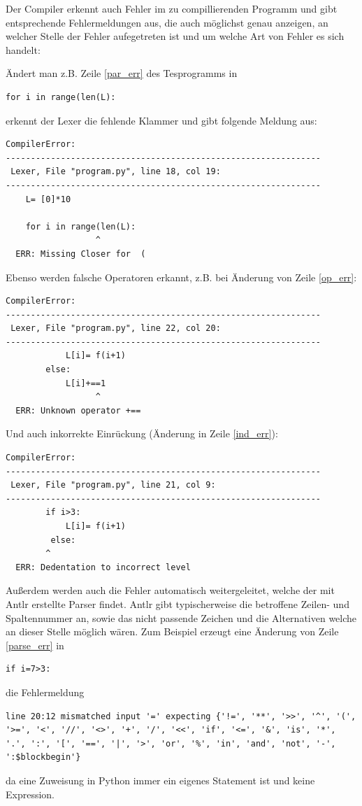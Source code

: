 Der Compiler erkennt auch Fehler im zu compillierenden Programm und gibt entsprechende Fehlermeldungen aus, die auch möglichst genau anzeigen, an welcher Stelle der Fehler aufegetreten ist und um welche Art von Fehler es sich handelt:

Ändert man z.B. Zeile \ref{par_err} des Tesprogramms in
\begin{lstlisting}
for i in range(len(L):
\end{lstlisting}

erkennt der Lexer die fehlende Klammer und gibt folgende Meldung aus:
\begin{lstlisting}
CompilerError: 
---------------------------------------------------------------
 Lexer, File "program.py", line 18, col 19:
---------------------------------------------------------------
    L= [0]*10

    for i in range(len(L):
                  ^
  ERR: Missing Closer for  ( 
\end{lstlisting}

\clearpage

Ebenso werden falsche Operatoren erkannt, z.B. bei Änderung von Zeile \ref{op_err}:
\begin{lstlisting}
CompilerError: 
---------------------------------------------------------------
 Lexer, File "program.py", line 22, col 20:
---------------------------------------------------------------
            L[i]= f(i+1)
        else:
            L[i]+==1
                  ^
  ERR: Unknown operator +==
\end{lstlisting}

Und auch inkorrekte Einrückung (Änderung in Zeile \ref{ind_err}):
\begin{lstlisting}
CompilerError: 
---------------------------------------------------------------
 Lexer, File "program.py", line 21, col 9:
---------------------------------------------------------------
        if i>3:
            L[i]= f(i+1)
         else:
        ^
  ERR: Dedentation to incorrect level  
\end{lstlisting}

Außerdem werden auch die Fehler automatisch weitergeleitet, welche der mit Antlr erstellte Parser findet. Antlr gibt typischerweise die betroffene Zeilen- und Spaltennummer an, sowie das nicht passende Zeichen und die Alternativen welche an dieser Stelle möglich wären. Zum Beispiel erzeugt eine Änderung von Zeile \ref{parse_err} in
\begin{lstlisting}
if i=7>3:
\end{lstlisting}
die Fehlermeldung
\begin{lstlisting}
line 20:12 mismatched input '=' expecting {'!=', '**', '>>', '^', '(', '>=', '<', '//', '<>', '+', '/', '<<', 'if', '<=', '&', 'is', '*', '.', ':', '[', '==', '|', '>', 'or', '%', 'in', 'and', 'not', '-', ':$blockbegin'}
\end{lstlisting}
da eine Zuweisung in Python immer ein eigenes Statement ist und keine Expression.\\


